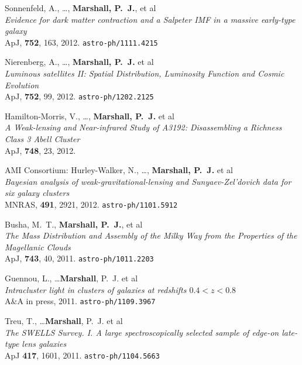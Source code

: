 \begin{revnumerate}
\item{{Sonnenfeld}, A., \ldots, \textbf{{Marshall}, P.~J.}, et al\\
\textit{Evidence for dark matter contraction and a Salpeter IMF in a massive early-type galaxy}\\
ApJ, \textbf{752}, 163, 2012.
\texttt{astro-ph/1111.4215}
}

\item{{Nierenberg}, A., \ldots, \textbf{{Marshall}, P.~J.} et al\\
\textit{Luminous satellites II: Spatial Distribution, Luminosity Function and
Cosmic Evolution}\\
ApJ, \textbf{752}, 99, 2012.
\texttt{astro-ph/1202.2125}
}

\item{{Hamilton-Morris}, V., \ldots, \textbf{{Marshall}, P.~J.} et al\\
\textit{A Weak-lensing and Near-infrared Study of A3192: Disassembling a Richness Class 3 Abell Cluster}\\
ApJ, \textbf{748}, 23, 2012.
}

\item{{AMI Consortium}: {Hurley-Walker}, N., \ldots, \textbf{{Marshall}, P.~J.} et al\\
\textit{Bayesian analysis of weak-gravitational-lensing and Sunyaev-Zel'dovich data for six galaxy clusters}\\
MNRAS, \textbf{491}, 2921, 2012.
\texttt{astro-ph/1101.5912}
}

\item{{Busha}, M.~T., \textbf{{Marshall}, P.~J.}, et al\\
\textit{The Mass Distribution and Assembly of the Milky Way from
the Properties of the Magellanic Clouds}\\
ApJ, \textbf{743}, 40, 2011.
\texttt{astro-ph/1011.2203}
}

\item{{Guennou}, L., \ldots \textbf{Marshall}, P.~J. et al\\
\textit{Intracluster light in clusters of galaxies at redshifts $0.4 < z < 0.8$}\\
A\&A in press, 2011.
\texttt{astro-ph/1109.3967}
}

\item{{Treu}, T., \ldots \textbf{Marshall}, P.~J. et al\\
\textit{The SWELLS Survey. I. A large spectroscopically selected sample of edge-on late-type lens galaxies}\\
ApJ \textbf{417}, 1601, 2011.
\texttt{astro-ph/1104.5663}
}


\end{revnumerate}
